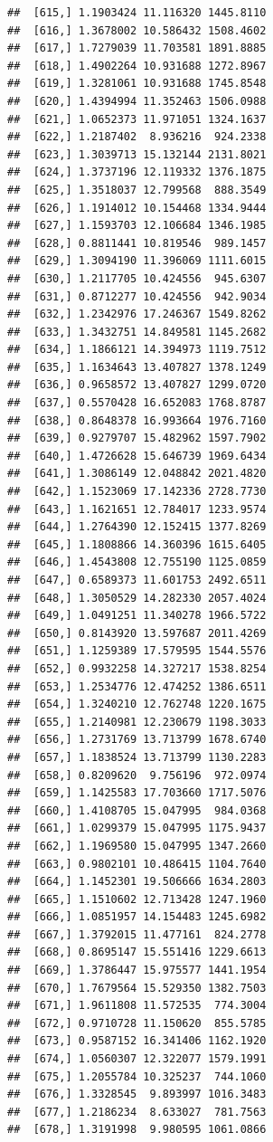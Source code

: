 \documentclass[article]{jss}\usepackage[]{graphicx}\usepackage[]{xcolor}
\makeatletter
\newenvironment{kframe}{%
 \def\at@end@of@kframe{}%
 \ifinner\ifhmode%
  \def\at@end@of@kframe{\end{minipage}}%
  \begin{minipage}{\columnwidth}%
 \fi\fi%
 \def\FrameCommand##1{\hskip\@totalleftmargin \hskip-\fboxsep
 \colorbox{shadecolor}{##1}\hskip-\fboxsep
     \hskip-\linewidth \hskip-\@totalleftmargin \hskip\columnwidth}%
 \MakeFramed {\advance\hsize-\width
   \@totalleftmargin\z@ \linewidth\hsize
   \@setminipage}}%
 {\par\unskip\endMakeFramed%
 \at@end@of@kframe}
\newenvironment{knitrout}{}{} %
\makeatother
\begin{document}
\begin{knitrout}
\begin{kframe}
\begin{verbatim}
##  [615,] 1.1903424 11.116320 1445.8110
##  [616,] 1.3678002 10.586432 1508.4602
##  [617,] 1.7279039 11.703581 1891.8885
##  [618,] 1.4902264 10.931688 1272.8967
##  [619,] 1.3281061 10.931688 1745.8548
##  [620,] 1.4394994 11.352463 1506.0988
##  [621,] 1.0652373 11.971051 1324.1637
##  [622,] 1.2187402  8.936216  924.2338
##  [623,] 1.3039713 15.132144 2131.8021
##  [624,] 1.3737196 12.119332 1376.1875
##  [625,] 1.3518037 12.799568  888.3549
##  [626,] 1.1914012 10.154468 1334.9444
##  [627,] 1.1593703 12.106684 1346.1985
##  [628,] 0.8811441 10.819546  989.1457
##  [629,] 1.3094190 11.396069 1111.6015
##  [630,] 1.2117705 10.424556  945.6307
##  [631,] 0.8712277 10.424556  942.9034
##  [632,] 1.2342976 17.246367 1549.8262
##  [633,] 1.3432751 14.849581 1145.2682
##  [634,] 1.1866121 14.394973 1119.7512
##  [635,] 1.1634643 13.407827 1378.1249
##  [636,] 0.9658572 13.407827 1299.0720
##  [637,] 0.5570428 16.652083 1768.8787
##  [638,] 0.8648378 16.993664 1976.7160
##  [639,] 0.9279707 15.482962 1597.7902
##  [640,] 1.4726628 15.646739 1969.6434
##  [641,] 1.3086149 12.048842 2021.4820
##  [642,] 1.1523069 17.142336 2728.7730
##  [643,] 1.1621651 12.784017 1233.9574
##  [644,] 1.2764390 12.152415 1377.8269
##  [645,] 1.1808866 14.360396 1615.6405
##  [646,] 1.4543808 12.755190 1125.0859
##  [647,] 0.6589373 11.601753 2492.6511
##  [648,] 1.3050529 14.282330 2057.4024
##  [649,] 1.0491251 11.340278 1966.5722
##  [650,] 0.8143920 13.597687 2011.4269
##  [651,] 1.1259389 17.579595 1544.5576
##  [652,] 0.9932258 14.327217 1538.8254
##  [653,] 1.2534776 12.474252 1386.6511
##  [654,] 1.3240210 12.762748 1220.1675
##  [655,] 1.2140981 12.230679 1198.3033
##  [656,] 1.2731769 13.713799 1678.6740
##  [657,] 1.1838524 13.713799 1130.2283
##  [658,] 0.8209620  9.756196  972.0974
##  [659,] 1.1425583 17.703660 1717.5076
##  [660,] 1.4108705 15.047995  984.0368
##  [661,] 1.0299379 15.047995 1175.9437
##  [662,] 1.1969580 15.047995 1347.2660
##  [663,] 0.9802101 10.486415 1104.7640
##  [664,] 1.1452301 19.506666 1634.2803
##  [665,] 1.1510602 12.713428 1247.1960
##  [666,] 1.0851957 14.154483 1245.6982
##  [667,] 1.3792015 11.477161  824.2778
##  [668,] 0.8695147 15.551416 1229.6613
##  [669,] 1.3786447 15.975577 1441.1954
##  [670,] 1.7679564 15.529350 1382.7503
##  [671,] 1.9611808 11.572535  774.3004
##  [672,] 0.9710728 11.150620  855.5785
##  [673,] 0.9587152 16.341406 1162.1920
##  [674,] 1.0560307 12.322077 1579.1991
##  [675,] 1.2055784 10.325237  744.1060
##  [676,] 1.3328545  9.893997 1016.3483
##  [677,] 1.2186234  8.633027  781.7563
##  [678,] 1.3191998  9.980595 1061.0866

\end{verbatim}
\end{kframe}
\end{knitrout}
\end{document}
